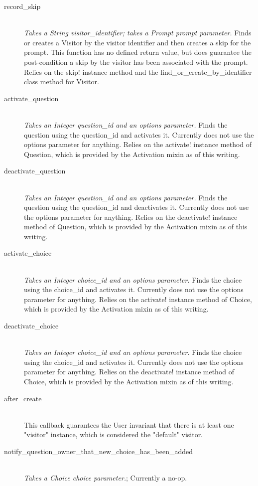 \documentclass[11pt]{book}
\begin{document}
\begin{description}
  \item[record\_skip]  \hfill \\
  \emph{Takes a String visitor\_identifier; takes a Prompt prompt parameter.}  Finds or creates a Visitor by the visitor identifier and then creates a skip for the prompt.  This function has no defined return value, but does guarantee the post-condition a skip by the visitor has been associated with the prompt. Relies on the skip! instance method and the find\_or\_create\_by\_identifier class method for Visitor.
  

	\item[activate\_question]  \hfill \\
  \emph{Takes an Integer question\_id and an options parameter.} Finds the question using the question\_id and activates it.  Currently does not use the options parameter for anything.  Relies on the activate! instance method of Question, which is provided by the Activation mixin as of this writing.
  
  
	\item[deactivate\_question]  \hfill \\
  \emph{Takes an Integer question\_id and an options parameter.} Finds the question using the question\_id and deactivates it.  Currently does not use the options parameter for anything.  Relies on the deactivate! instance method of Question, which is provided by the Activation mixin as of this writing.

	\item[activate\_choice]  \hfill \\
  \emph{Takes an Integer choice\_id and an options parameter.} Finds the choice using the choice\_id and activates it.  Currently does not use the options parameter for anything.  Relies on the activate! instance method of Choice, which is provided by the Activation mixin as of this writing.
  
  
	\item[deactivate\_choice]  \hfill \\
  \emph{Takes an Integer choice\_id and an options parameter.} Finds the choice using the choice\_id and activates it.  Currently does not use the options parameter for anything.  Relies on the deactivate! instance method of Choice, which is provided by the Activation mixin as of this writing.
  
  \item[after\_create]  \hfill \\
  This callback guarantees the User invariant that there is at least one "visitor" instance, which is considered the "default" visitor.
  
  \item[notify\_question\_owner\_that\_new\_choice\_has\_been\_added]  \hfill \\
  \emph{Takes a Choice choice parameter.}; Currently a no-op.
  
\end{description}
\end{document}
